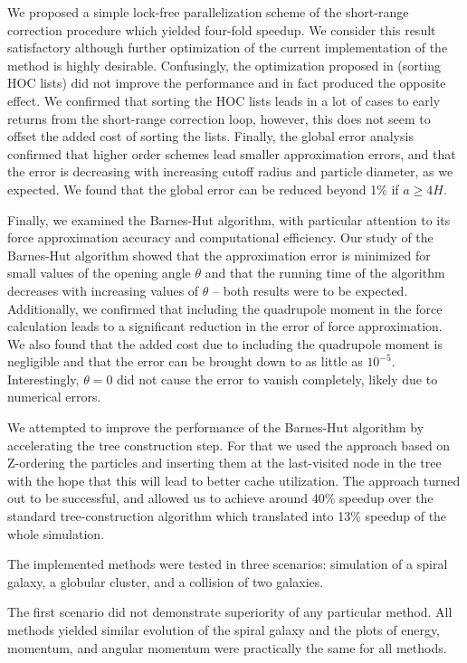 We proposed a simple lock-free parallelization scheme of the short-range correction procedure which yielded four-fold speedup.
We consider this result satisfactory although further optimization of the current implementation of the \PThreeM{} method is highly desirable.
Confusingly, the optimization proposed in \cite{Hockney1988} (sorting HOC lists) did not improve the performance and in fact produced the opposite effect.
We confirmed that sorting the HOC lists leads in a lot of cases to early returns from the short-range correction loop, however, this does not seem to offset the added cost of sorting the lists.
Finally, the global error analysis confirmed that higher order schemes lead smaller approximation errors, and that the error is decreasing with increasing cutoff radius and particle diameter, as we expected.
We found that the global error can be reduced beyond 1\% if $a \geq 4 H$.

Finally, we examined the Barnes-Hut algorithm, with particular attention to its force approximation accuracy and computational efficiency.
Our study of the Barnes-Hut algorithm showed that the approximation error is minimized for small values of the opening angle $\theta$ and that the running time of the algorithm decreases with increasing values of $\theta$ -- both results were to be expected.
Additionally, we confirmed that including the quadrupole moment in the force calculation leads to a significant reduction in the error of force approximation.
We also found that the added cost due to including the quadrupole moment is negligible and that the error can be brought down to as little as $10^{-5}$.
Interestingly, $\theta = 0$ did not cause the error to vanish completely, likely due to numerical errors.

We attempted to improve the performance of the Barnes-Hut algorithm by accelerating the tree construction step.
For that we used the approach based on Z-ordering the particles and inserting them at the last-visited node in the tree with the hope that this will lead to better cache utilization.
The approach turned out to be successful, and allowed us to achieve around 40\% speedup over the standard tree-construction algorithm which translated into 13\% speedup of the whole simulation.

The implemented methods were tested in three scenarios: simulation of a spiral galaxy, a globular cluster, and a collision of two galaxies.

The first scenario did not demonstrate superiority of any particular method.
All methods yielded similar evolution of the spiral galaxy and the plots of energy, momentum, and angular momentum were practically the same for all methods.

